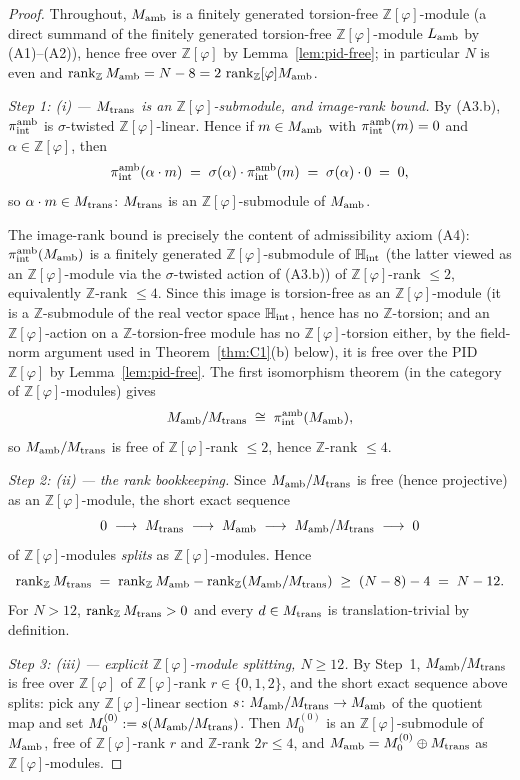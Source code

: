 \documentclass[11pt, a4paper]{amsart}
\theoremstyle{definition}
\newcommand{\Z}{\mathbb{Z}}
\newcommand{\HH}{\mathbb{H}}
\newcommand{\rk}{\operatorname{rank}}
\newcommand{\Ophi}{\mathbb{Z}[\varphi]}
\begin{document}
\begin{proof}
Throughout, $M_{\rm amb}$ is a finitely generated torsion-free
$\Ophi$-module (a direct summand of the finitely generated
torsion-free $\Ophi$-module $L_{\rm amb}$ by (A1)--(A2)), hence
free over $\Ophi$ by Lemma~\ref{lem:pid-free}; in particular
$N$ is even and $\rk_\Z M_{\rm amb} = N - 8 = 2\,
\rk_\Ophi M_{\rm amb}$.

\emph{Step 1: (i) --- $M_{\rm trans}$ is an
$\Ophi$-submodule, and image-rank bound.}
By (A3.b), $\pi_{\rm int}^{\rm amb}$ is $\sigma$-twisted
$\Ophi$-linear. Hence if $m \in M_{\rm amb}$ with $\pi_{\rm
int}^{\rm amb}(m) = 0$ and $\alpha \in \Ophi$, then
\[
  \pi_{\rm int}^{\rm amb}(\alpha \cdot m)
  \;=\; \sigma(\alpha) \cdot \pi_{\rm int}^{\rm amb}(m)
  \;=\; \sigma(\alpha) \cdot 0
  \;=\; 0,
\]
so $\alpha \cdot m \in M_{\rm trans}$: $M_{\rm trans}$ is an
$\Ophi$-submodule of $M_{\rm amb}$.

The image-rank bound is precisely the content of admissibility
axiom (A4): $\pi_{\rm int}^{\rm amb}(M_{\rm amb})$ is a
finitely generated $\Ophi$-submodule of $\HH_{\rm int}$
(the latter viewed as an $\Ophi$-module via the
$\sigma$-twisted action of (A3.b)) of $\Ophi$-rank $\leq 2$,
equivalently $\Z$-rank $\leq 4$. Since this image is
torsion-free as an $\Ophi$-module (it is a $\Z$-submodule of
the real vector space $\HH_{\rm int}$, hence has no
$\Z$-torsion; and an $\Ophi$-action on a $\Z$-torsion-free
module has no $\Ophi$-torsion either, by the field-norm
argument used in Theorem~\ref{thm:C1}(b) below), it is free
over the PID $\Ophi$ by Lemma~\ref{lem:pid-free}. The first
isomorphism theorem (in the category of $\Ophi$-modules) gives
\[
  M_{\rm amb} / M_{\rm trans}
  \;\cong\; \pi_{\rm int}^{\rm amb}(M_{\rm amb}),
\]
so $M_{\rm amb} / M_{\rm trans}$ is free of $\Ophi$-rank
$\leq 2$, hence $\Z$-rank $\leq 4$.

\emph{Step 2: (ii) --- the rank bookkeeping.}
Since $M_{\rm amb} / M_{\rm trans}$ is free (hence projective)
as an $\Ophi$-module, the short exact sequence
\[
  0 \;\longrightarrow\; M_{\rm trans}
    \;\longrightarrow\; M_{\rm amb}
    \;\longrightarrow\; M_{\rm amb} / M_{\rm trans}
    \;\longrightarrow\; 0
\]
of $\Ophi$-modules \emph{splits} as $\Ophi$-modules. Hence
\[
  \rk_\Z M_{\rm trans}
  \;=\; \rk_\Z M_{\rm amb} - \rk_\Z(M_{\rm amb} / M_{\rm trans})
  \;\geq\; (N - 8) - 4
  \;=\; N - 12.
\]
For $N > 12$, $\rk_\Z M_{\rm trans} > 0$ and every $d \in
M_{\rm trans}$ is translation-trivial by definition.

\emph{Step 3: (iii) --- explicit $\Ophi$-module splitting,
$N \geq 12$.}
By Step~1, $M_{\rm amb} / M_{\rm trans}$ is free over $\Ophi$
of $\Ophi$-rank $r \in \{0, 1, 2\}$, and the short exact
sequence above splits: pick any $\Ophi$-linear section
$s \colon M_{\rm amb} / M_{\rm trans} \to M_{\rm amb}$ of the
quotient map and set $M_0^{(0)} := s(M_{\rm amb} / M_{\rm
trans})$. Then $M_0^{(0)}$ is an $\Ophi$-submodule of $M_{\rm
amb}$, free of $\Ophi$-rank $r$ and $\Z$-rank $2r \leq 4$, and
$M_{\rm amb} = M_0^{(0)} \oplus M_{\rm trans}$ as
$\Ophi$-modules.


\end{proof}
\end{document}
